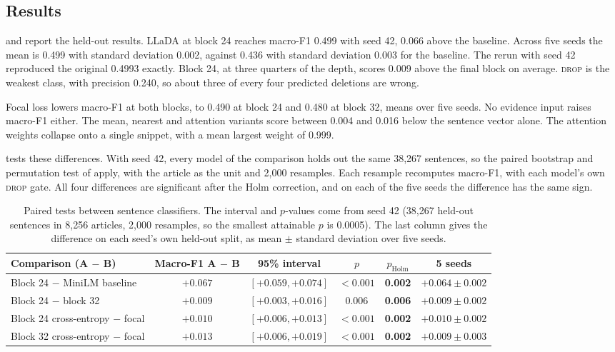 \documentclass[]{paper}
\newcommand{\drop}{\textsc{drop}}
\begin{document}
\subsection{Results}

 and  report the held-out results. LLaDA at block 24 reaches macro-F1 0.499 with seed 42, 0.066 above the baseline. Across five seeds the mean is 0.499 with standard deviation 0.002, against 0.436 with standard deviation 0.003 for the baseline. The rerun with seed 42 reproduced the original 0.4993 exactly. Block 24, at three quarters of the depth, scores 0.009 above the final block on average. \drop{} is the weakest class, with precision 0.240, so about three of every four predicted deletions are wrong.

Focal loss lowers macro-F1 at both blocks, to 0.490 at block 24 and 0.480 at block 32, means over five seeds. No evidence input raises macro-F1 either. The mean, nearest and attention variants score between 0.004 and 0.016 below the sentence vector alone. The attention weights collapse onto a single snippet, with a mean largest weight of 0.999.

 tests these differences. With seed 42, every model of the comparison holds out the same 38,267 sentences, so the paired bootstrap and permutation test of  apply, with the article as the unit and 2,000 resamples. Each resample recomputes macro-F1, with each model's own \drop{} gate. All four differences are significant after the Holm correction, and on each of the five seeds the difference has the same sign.

\begin{table}[t]
\caption{Paired tests between sentence classifiers. The interval and $p$-values come from seed 42 (38,267 held-out sentences in 8,256 articles, 2,000 resamples, so the smallest attainable $p$ is 0.0005). The last column gives the difference on each seed's own held-out split, as mean $\pm$ standard deviation over five seeds.}
\label{tab:classifier_tests}
\centering
\footnotesize
\begin{tabular}{lccccc}
\toprule
Comparison (A $-$ B) & Macro-F1 A $-$ B & 95\% interval & $p$ & $p_{\text{Holm}}$ & 5 seeds \\
\midrule
Block 24 $-$ MiniLM baseline & $+0.067$ & $[+0.059, +0.074]$ & $<0.001$ & \textbf{0.002} & $+0.064 \pm 0.002$ \\
Block 24 $-$ block 32 & $+0.009$ & $[+0.003, +0.016]$ & 0.006 & \textbf{0.006} & $+0.009 \pm 0.002$ \\
Block 24 cross-entropy $-$ focal & $+0.010$ & $[+0.006, +0.013]$ & $<0.001$ & \textbf{0.002} & $+0.010 \pm 0.002$ \\
Block 32 cross-entropy $-$ focal & $+0.013$ & $[+0.006, +0.019]$ & $<0.001$ & \textbf{0.002} & $+0.009 \pm 0.003$ \\
\bottomrule
\end{tabular}
\end{table}
\end{document}
